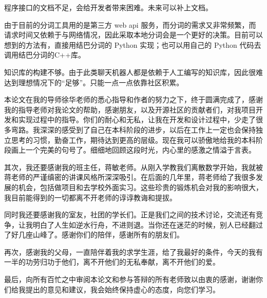 \documentclass[bachelor,winfonts]{jnuthesis}
\begin{document}
程序接口的文档不足，会给开发者带来困难。未来可以补上文档。

由于目前的分词工具用的是第三方 web api 服务，而分词的需求又非常频繁，而请求时间又依赖于与网络情况，因此采取本地分词会是一个更好的决策。目前可以想到的方法有，直接用结巴分词的 Python 实现；也可以用自己的 Python 代码去调用结巴分词的C++库。

知识库的构建不够。由于此类聊天机器人都是依赖于人工编写的知识库，因此很难达到理想情况下的“足够”。只能一点一点依靠社区积累。

\nocite{*}


\begin{acknowledgement}
  本论文在我的导师徐华老师的悉心指导和作者的努力之下，终于圆满完成了，感谢我的指导老师对我论文的帮助，感谢朋友，以及开源社区的贡献者们，对我项目开发和实现过程中的指导。你们的耐心和无私，让我在开发和设计过程中，少走了很多弯路。我深深的感受到了自己在本科阶段的进步，以后在工作上一定也会保持独立思考的习惯，勤奋工作，期待达到更高的层级。现在我可以骄傲地给我的本科阶段画上一个完美的句号了。细细地回顾这段时光，内心里的感激之情溢于言表。

  其次，我还要感谢我的班主任，蒋敏老师。从刚入学教我们离散数学开始，我就被蒋老师的严谨缜密的讲课风格所深深吸引。在后面的几年里，蒋老师给了我很多发展的机会，包括做项目和去学校外面实习。这些珍贵的锻炼机会对我的影响很大，我目前能得到的一切都离不开老师的谆谆教诲和提拔。

  同时我还要感谢我的室友，社团的学长们。正是我们之间的技术讨论，交流还有竞争，让我明白了人生如逆水行舟，不进则退。当你还在迷茫的时候，别人已经翻过了好几座山峰了。感谢你们的陪伴，感谢所有的朋友们。

  再次，感谢我的父母，一直陪伴着我的求学生涯，给了我最好的条件，今天的我有一半的功劳归功于他们，离不开他们的无私奉献，离不开他们的爱。

  最后，向所有百忙之中审阅本论文和参与答辩的所有老师致以由衷的感谢，谢谢你们给我提出的意见和建议，我会始终保持虚心的态度，向您们学习。

\end{acknowledgement}
\end{document}
